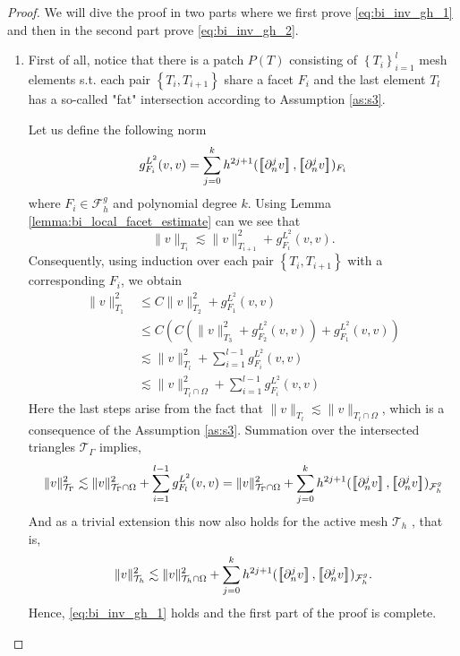 \begin{proof}
    We will dive the proof in two parts where we first prove \eqref{eq:bi_inv_gh_1} and then in the second part prove \eqref{eq:bi_inv_gh_2}.
    \begin{enumerate}[label=\arabic*)]
        \item
            First of all, notice that there is a patch $P(T) $ consisting of $\left\{ T_{i} \right\}_{i=1}^{l} $ mesh elements s.t. each pair $ \left\{ T_{i}, T_{i+1} \right\} $ share a facet $F_{i}$ and the last element $T_{l}$ has a so-called "fat"
            intersection according to Assumption \ref{as:s3}.

            Let us define the following norm \[
            g_{F_{i}}^{L^{2}}( v,v)  = \sum_{j=0}^{k} h^{2j+1}( \jump{ \partial ^{j}_{n}v }, \jump{ \partial ^{j}_{n}v }    )_{F_{i} }
            \]
            where $F_{i} \in  \mathcal{F} ^{g}_{h}$ and polynomial degree $ k$. Using Lemma \ref{lemma:bi_local_facet_estimate} can we see that \[
            \| v \|_{ T_{i} }^{  } \lesssim \| v \|_{ T_{i+1} }^{ 2 } + g_{F_{i}}^{L^{2}}( v,v).
            \]
    Consequently, using induction over each pair $\left\{ T_{i}, T_{i+1} \right\} $ with a corresponding $F_{i}$, we obtain
            \[
                \begin{split}
            \| v \|_{ T_{1} }^{2  }  & \le  C \| v \|_{ T_{2} }^{ 2 } + g_{F_{1}}^{L^{2}}( v,v)\\
              & \le  C( C( \| v \|_{ T_{3} }^{ 2 } + g_{F_{2}}^{L^{2}}( v,v) ) + g_{F_{1}}^{L^{2}}( v,v) )\\
              & \lesssim    \| v \|_{ T_{l} }^{ 2 }  + \sum_{i=1}^{l-1} g_{F_{i}}^{L^{2}}( v,v)  \\
              & \lesssim    \| v \|_{ T_{l} \cap \Omega  }^{ 2 }  + \sum_{i=1}^{l-1} g_{F_{i}}^{L^{2}}( v,v)
                \end{split}
            \]
            Here the last steps arise from the fact that $\|  v \|_{ T_{l} }^{  } \lesssim  \|  v \|_{ T_{l} \cap \Omega  }^{  }  $, which is a consequence of the Assumption \ref{as:s3}.
Summation over the intersected triangles $\mathcal{T} _{\Gamma }$ implies,
            \[
                    \| v \|_{ \mathcal{T} _{\Gamma } }^{2  } \lesssim \| v \|_{ \mathcal{T} _{\Gamma}\cap \Omega  }^{2  }+ \sum_{i=1}^{l-1} g_{F_{l}}^{L^{2}}( v,v) \\
                     = \| v \|_{ \mathcal{T}_{\Gamma } \cap \Omega   }^{ 2 }  + \sum_{j=0}^{k} h^{2j+1} ( \jump{ \partial ^{j}_{n} v }, \jump{ \partial ^{j}_{n}v }    )_{\mathcal{F}_{h}^{g}}
        \]
        And as a trivial extension this now also holds for the active mesh $\mathcal{T} _{h}$ , that is, \[
                    \| v \|_{ \mathcal{T} _{h } }^{2  } \lesssim  \| v \|_{ \mathcal{T}_{h } \cap \Omega   }^{ 2 }  + \sum_{j=0}^{k} h^{2j+1} ( \jump{ \partial ^{j}_{n} v }, \jump{ \partial ^{j}_{n}v }    )_{\mathcal{F}_{h}^{g}}.
        \]
        Hence, \eqref{eq:bi_inv_gh_1} holds and the first part of the proof is complete.


\end{enumerate}
\end{proof}
